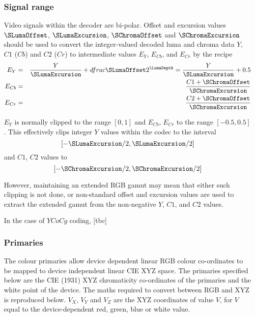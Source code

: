 \begin{informative*}
\subsubsection{Signal range}
\label{signalranges}

Video signals within the decoder are bi-polar. Offset  and excursion values 
$\SLumaOffset$, $\SLumaExcursion$, $\SChromaOffset$ and
$\SChromaExcursion$ should be used to convert the
integer-valued decoded luma and chroma data $Y$, $C1$ ($Cb$) and $C2$ ($Cr$) 
to intermediate values $E_Y$, $E_{Cb}$, and $E_{Cr}$ by the recipe
\begin{eqnarray*}
E_Y & = & \dfrac{Y}{\SLumaExcursion}+dfrac{\SLumaOffset}{2^\LumaDepth} = \dfrac{Y}{\SLumaExcursion}+0.5\\
E_{Cb} & = & \dfrac{C1+\SChromaOffset}{\SChromaExcursion} \\
E_{Cr} & = & \dfrac{C2+\SChromaOffset}{\SChromaExcursion}
\end{eqnarray*}

$E_Y$ is normally clipped to the range $[0,1]$ and $E_{Cb}$, $E_{Cr}$
to the range $[-0.5,0.5]$. This effectively clips integer $Y$ values within
the codec to 
the interval
\[ [-\SLumaExcursion/2, \SLumaExcursion/2] \]
and $C1$, $C2$ values to
\[ [-\SChromaExcursion/2,\SChromaExcursion/2] \]

However, maintaining an extended RGB gamut may mean that either such
clipping is not done, or non-standard offset and excursion values are
used to extract the extended gamut from the non-negative $Y$, $C1$,
and $C2$ values.

In the case of $YCoCg$ coding, [tbc]

\begin{comment}
Non-default offset and excursion values cannot be coded if the chroma
format is YCoCg: default parameters should be used. However, even in
this case, EY, ECo, and ECg should not be calculated. Instead, direct
integer conversion to RGB should be done as described in Section . (In
fact, excursion values will be ignored in this integer conversion.)
\end{comment}

\subsubsection{Primaries}
\label{primaries}
The colour primaries allow device dependent linear RGB colour
co-ordinates to be mapped to device independent linear CIE XYZ space.
The primaries specified below are the CIE (1931) XYZ chromaticity
co-ordinates of the primaries and the white point of the device. The
maths required to convert between RGB and XYZ is reproduced below. $V_X$,
$V_Y$ and $V_Z$ are the XYZ coordinates of value $V$, for $V$ equal to
the device-dependent red, green, blue or white value.


\end{informative*}
